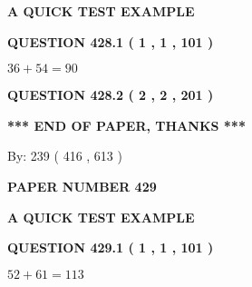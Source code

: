 \documentclass[12pt]{article}
\begin{document}
   
   
   
 \vspace{0.2in}
{\LARGE {\textbf{ A QUICK TEST EXAMPLE}}}
   
   
  
\vspace{0.2in}
  
{\textbf{\Large{QUESTION
428.1 
 ( 1 , 1 , 101 )
}}}
  
  
 
 

$ %
36 +  %
54=   %
90$
 
 
  
\vspace{0.2in}
  
{\textbf{\Large{QUESTION
428.2 
 ( 2 , 2 , 201 )
}}}
  
  
   
   
 \vspace{0.2in}
 
   
   
   
   
\vspace{1.0in} 
{\textbf{\large{ *** END OF PAPER, THANKS *** }}} 
   
   
\hspace{1.0in} By: 
 239 ( 416 ,  613 )
   
   
   
   
\newpage 
\setcounter{page}{ 
   429001 } 
   
   
   
   
 {\textbf{ \Large{ PAPER NUMBER  429  }}}
   
   
\vspace{0.2in}
   
   
   
   
   
   
 \vspace{0.2in}
{\LARGE {\textbf{ A QUICK TEST EXAMPLE}}}
   
   
  
\vspace{0.2in}
  
{\textbf{\Large{QUESTION
429.1 
 ( 1 , 1 , 101 )
}}}
  
  
 
 

$ %
52 +  %
61=   %
113$
 
 
  
\vspace{0.2in}
  
\end{document}
